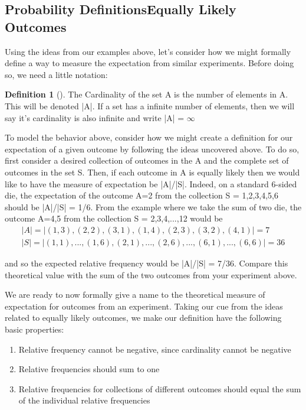 \documentclass[10pt,]{book}
\theoremstyle{plain}
\theoremstyle{definition}
\newtheorem{definition}[theorem]{Definition}
\theoremstyle{definition}
\numberwithin{equation}{section}
\begin{document}
\subsection[Probability DefinitionsEqually Likely Outcomes]{Probability DefinitionsEqually Likely Outcomes}\label{ProbabilityDefns}
Using the ideas from our examples above, let's consider how we might formally define a way
	to measure the expectation from similar experiments.  Before doing so, we need a little notation:%
\begin{definition}[]\label{definition-1}
The Cardinality of the set A is the number of elements in A. This will be denoted |A|. If a set has
	a infinite number of elements, then we will say it's cardinality is also infinite and 
	write |A| = \(\infty\)\end{definition}
\par
To model the behavior above, consider how we might create a definition for our expectation
	of a given outcome by following the ideas uncovered above. To do so, first consider a desired collection
	of outcomes in the A and the complete set of outcomes in the set S. Then, if each outcome in A is
	equally likely then we would like to have the measure of expectation be |A|/|S|. Indeed, on a standard 
	6-sided die, the expectation of the outcome A={2} from the collection S = {1,2,3,4,5,6} should be
	|A|/|S| = 1/6.  From the example where we take the sum of two die, the outcome A={4,5} from the
	collection S = {2,3,4,...,12} would be%
\begin{gather*}
|A| = | {(1,3),(2,2),(3,1),(1,4),(2,3),(3,2),(4,1)}| = 7\\
|S| = | {(1,1),...,(1,6),(2,1),...,(2,6),...,(6,1),...,(6,6)}| = 36
\end{gather*}\par
and so the expected relative frequency would be |A|/|S| = 7/36. Compare this theoretical value
	with the sum of the two outcomes from your experiment above.%
\par
We are ready to now formally give a name to the theoretical measure of expectation for
	outcomes from an experiment. Taking our cue from the ideas related to equally likely outcomes, we 
	make our definition have the following basic properties:%
\leavevmode%
\begin{enumerate}
\item\hypertarget{li-1}{}Relative frequency cannot be negative, since cardinality cannot be negative\item\hypertarget{li-2}{}Relative frequencies should sum to one\item\hypertarget{li-3}{}Relative frequencies for collections of different outcomes should equal the sum of the
	individual relative frequencies\end{enumerate}
\end{document}
